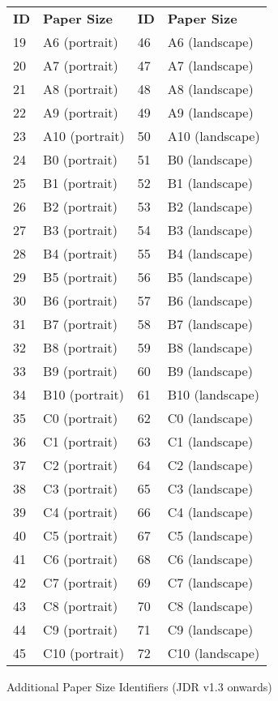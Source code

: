 \begin{numbered}
\begin{enumerate}
{%
  \begin{tabular}{llll}
  \bfseries ID & \bfseries Paper Size &
  \bfseries ID & \bfseries Paper Size\\
  19 & A6 (portrait) & 46 & A6 (landscape)\\
  20 & A7 (portrait) & 47 & A7 (landscape)\\
  21 & A8 (portrait) & 48 & A8 (landscape)\\
  22 & A9 (portrait) & 49 & A9 (landscape)\\
  23 & A10 (portrait) & 50 & A10 (landscape)\\
  24 & B0 (portrait) & 51 & B0 (landscape)\\
  25 & B1 (portrait) & 52 & B1 (landscape)\\
  26 & B2 (portrait) & 53 & B2 (landscape)\\
  27 & B3 (portrait) & 54 & B3 (landscape)\\
  28 & B4 (portrait) & 55 & B4 (landscape)\\
  29 & B5 (portrait) & 56 & B5 (landscape)\\
  30 & B6 (portrait) & 57 & B6 (landscape)\\
  31 & B7 (portrait) & 58 & B7 (landscape)\\
  32 & B8 (portrait) & 59 & B8 (landscape)\\
  33 & B9 (portrait) & 60 & B9 (landscape)\\
  34 & B10 (portrait) & 61 & B10 (landscape)\\
  35 & C0 (portrait) & 62 & C0 (landscape)\\
  36 & C1 (portrait) & 63 & C1 (landscape)\\
  37 & C2 (portrait) & 64 & C2 (landscape)\\
  38 & C3 (portrait) & 65 & C3 (landscape)\\
  39 & C4 (portrait) & 66 & C4 (landscape)\\
  40 & C5 (portrait) & 67 & C5 (landscape)\\
  41 & C6 (portrait) & 68 & C6 (landscape)\\
  42 & C7 (portrait) & 69 & C7 (landscape)\\
  43 & C8 (portrait) & 70 & C8 (landscape)\\
  44 & C9 (portrait) & 71 & C9 (landscape)\\
  45 & C10 (portrait) & 72 & C10 (landscape)
  \end{tabular}
}
{Additional Paper Size Identifiers (JDR v1.3 onwards)}


\end{enumerate}
\end{numbered}
